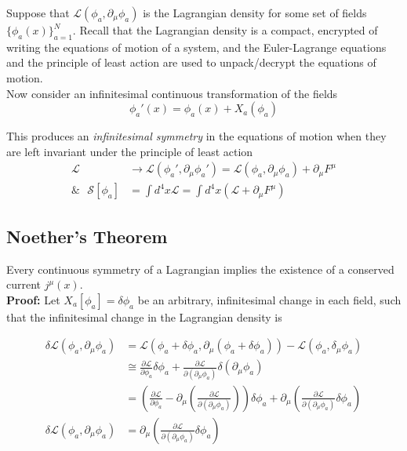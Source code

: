 \noindent Suppose that $\mathscr{L}(\phi_a, \partial_\mu \phi_a)$ is the Lagrangian density for some set of fields $\{ \phi_a(x) \}_{a=1}^N$. Recall that the Lagrangian density is a compact, encrypted of writing the equations of motion of a system, and the Euler-Lagrange equations and the principle of least action are used to unpack/decrypt the equations of motion. \\

\noindent Now consider an infinitesimal continuous transformation of the fields
\begin{equation}
\phi_a '(x) = \phi_a(x) + X_a(\phi_a)
\end{equation}

\noindent This produces an \textit{infinitesimal symmetry} in the equations of motion when they are left invariant under the principle of least action
\begin{align}
\mathscr{L} &\rightarrow \mathscr{L}(\phi_a', \partial_\mu \phi_a') = \mathscr{L}(\phi_a, \partial_\mu \phi_a) + \partial_\mu F^\mu \\
\& \,\,\,\, \mathcal{S} [ \phi_a ] &= \int d^4 x \mathscr{L} = \int d^4 x ( \mathscr{L} + \partial_\mu F^\mu )
\end{align}

\subsection*{Noether's Theorem}

\noindent Every continuous symmetry of a Lagrangian implies the existence of a conserved current $j^\mu(x)$. \\

\noindent \textbf{Proof:} Let $X_a[\phi_a] = \delta \phi_a$ be an arbitrary, infinitesimal change in each field, such that the infinitesimal change in the Lagrangian density is 

\begin{align}
\delta \mathscr{L}(\phi_a, \partial_\mu \phi_a) &= \mathscr{L}(\phi_a+\delta \phi_a, \partial_\mu(\phi_a + \delta \phi_a)) - \mathscr{L}(\phi_a, \delta_\mu \phi_a) \\
&\cong \frac{\partial \mathscr{L}}{\partial \phi_a} \delta \phi_a + \frac{\partial \mathscr{L}}{\partial (\partial_\mu \phi_a)} \delta(\partial_\mu \phi_a) \\
&= \left( \frac{\partial \mathscr{L}}{\partial \phi_a} - \partial_\mu \left( \frac{\partial \mathscr{L}}{\partial (\partial_\mu \phi_a)} \right) \right) \delta \phi_a + \partial_\mu \left( \frac{\partial \mathscr{L}}{\partial (\partial_\mu \phi_a)} \delta \phi_a \right) \\
\delta \mathscr{L}(\phi_a, \partial_\mu \phi_a) &= \partial_\mu \left( \frac{\partial \mathscr{L}}{\partial (\partial_\mu \phi_a)} \delta \phi_a \right)
\end{align}

